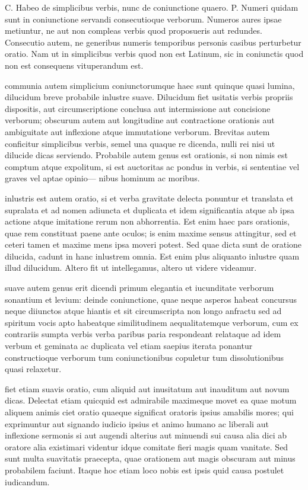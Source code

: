  C. Habeo de simplicibus verbis, nunc de coniunctione quaero. P. Numeri quidam sunt in coniunctione servandi consecutioque verborum. Numeros aures ipsae metiuntur, ne aut non compleas verbis quod proposueris aut redundes. Consecutio autem, ne generibus numeris temporibus personis casibus perturbetur oratio. Nam ut in simplicibus verbis quod non est Latinum, sic in coniunctis quod non est consequens vituperandum est.

 communia autem simplicium coniunctorumque haec sunt quinque quasi lumina, dilucidum breve probabile inlustre suave. Dilucidum fiet usitatis verbis propriis dispositis, aut circumscriptione conclusa aut intermissione aut concisione verborum; obscurum autem aut longitudine aut contractione orationis aut ambiguitate aut inflexione atque immutatione verborum. Brevitas autem conficitur simplicibus verbis, semel una quaque re dicenda, nulli rei nisi ut dilucide dicas serviendo. Probabile autem genus est orationis, si non nimis est comptum atque expolitum, si est auctoritas ac pondus in verbis, si sententiae vel graves vel aptae opinio— nibus hominum ac moribus.

 inlustris est autem oratio, si et verba gravitate delecta ponuntur et translata et supralata et ad nomen adiuncta et duplicata et idem significantia atque ab ipsa actione atque imitatione rerum non abhorrentia. Est enim haec pars orationis, quae rem constituat paene ante oculos; is enim maxime sensus attingitur, sed et ceteri tamen et maxime mens ipsa moveri potest. Sed quae dicta sunt de oratione dilucida, cadunt in hanc inlustrem omnia. Est enim plus aliquanto inlustre quam illud dilucidum. Altero fit ut intellegamus, altero ut videre videamur.

 suave autem genus erit dicendi primum elegantia et iucunditate verborum sonantium et levium: deinde coniunctione, quae neque asperos habeat concursus neque diiunctos atque hiantis et sit circumscripta non longo anfractu sed ad spiritum vocis apto habeatque similitudinem aequalitatemque verborum, cum ex contrariis sumpta verbis verba paribus paria respondeant relataque ad idem verbum et geminata ac duplicata vel etiam saepius iterata ponantur constructioque verborum tum coniunctionibus copuletur tum dissolutionibus quasi relaxetur.

 fiet etiam suavis oratio, cum aliquid aut inusitatum aut inauditum aut novum dicas. Delectat etiam quicquid est admirabile maximeque movet ea quae motum aliquem animis ciet oratio quaeque significat oratoris ipsius amabilis mores; qui exprimuntur aut signando iudicio ipsius et animo humano ac liberali aut inflexione sermonis si aut augendi alterius aut minuendi sui causa alia dici ab oratore alia existimari videntur idque comitate fieri magis quam vanitate. Sed sunt multa suavitatis praecepta, quae orationem aut magis obscuram aut minus probabilem faciunt. Itaque hoc etiam loco nobis est ipsis quid causa postulet iudicandum.

